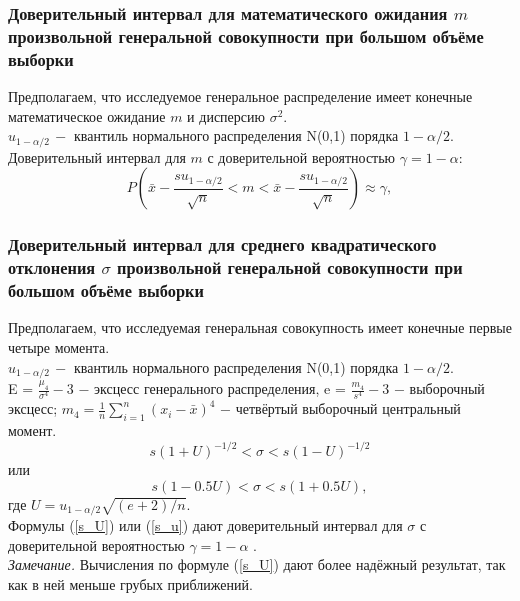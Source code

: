 \subsubsection{Доверительный интервал для математического ожидания $m$ произвольной генеральной совокупности при большом объёме выборки}
\begin{flushleft}
	Предполагаем, что исследуемое генеральное распределение имеет конечные математическое ожидание $m$ и дисперсию $\sigma^{2}$.\\
	$u_{1-\alpha/2}\,-$  квантиль нормального распределения N(0,1) порядка $1-\alpha/2$.\\
	Доверительный интервал для $m$ с доверительной вероятностью $\gamma = 1-\alpha$:
	\begin{equation}
		P\left(\bar{x} - \frac{su_{1-\alpha/2}}{\sqrt{n}} < m < \bar{x} - \frac{su_{1-\alpha/2}}{\sqrt{n}} \right) \approx \gamma,
		\label{P_fin_u}
	\end{equation}
\end{flushleft}

\subsubsection{Доверительный интервал для среднего квадратического отклонения $\sigma$ произвольной генеральной совокупности при большом объёме выборки}
\begin{flushleft}
	Предполагаем, что исследуемая генеральная совокупность имеет конечные первые четыре момента.\\
	$u_{1-\alpha/2}\,-$ квантиль нормального распределения N(0,1) порядка $1-\alpha/2$.\\
	E = $\frac{\mu_{4}}{\sigma^{4}} - 3$ $-$ эксцесс генерального распределения, e = $\frac{m_{4}}{s^{4}} - 3$ $-$ выборочный эксцесс; $m_{4} = \frac{1}{n}\sum_{i =1}^{n}{(x_{i} - \bar{x})^{4}}$  $-$ четвёртый выборочный центральный момент.
	\begin{equation}
		s(1 + U)^{-1/2} < \sigma < s(1-U)^{-1/2}
		\label{s_U}
	\end{equation}
	или
	\begin{equation}
		s(1-0.5U) < \sigma < s(1 + 0.5U),
		\label{s_u}
	\end{equation}
	где $U = u_{1-\alpha/2}\sqrt{(e+2)/n}$.\\
	Формулы (\ref{s_U}) или (\ref{s_u}) дают доверительный интервал для $\sigma$ с доверительной вероятностью $\gamma = 1-\alpha$ \cite[с.~461-462]{1}.\\
	\textit{Замечание.} Вычисления по формуле (\ref{s_U}) дают более надёжный результат, так как в ней меньше грубых приближений.
\end{flushleft}